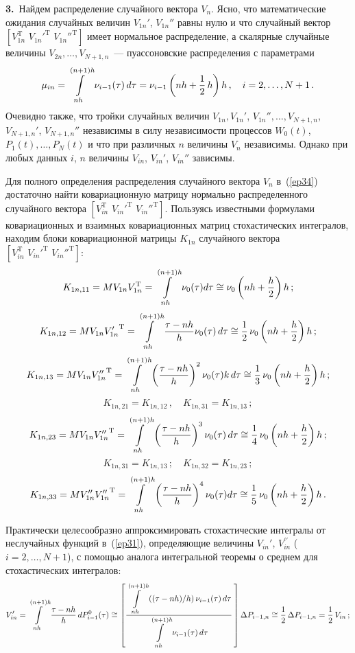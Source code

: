 {\textbf{3.}\ Найдем распределение случайного вектора $V_n$. Ясно, что математические
ожидания случайных величин $V_{1n}'$, $V_{1n}''$ равны нулю и что
случайный вектор $[V_{1n}^{\mathrm{T}}\,\, {V_{1n}'}^{\mathrm{T}}\,\, {V_{1n}''}^{\mathrm{T}}]$
имеет нормальное распределение, а скалярные случайные величины
$V_{2n},\ldots,V_{N+1,n}$~--- пуассоновские распределения с параметрами
\begin{equation*}
\mu_{in}=\inh \nu_{i-1}(\tau)\,d\tau=\nu_{i-1}
    \left(nh+\fr{1}{2}\,h\right)h\,,\quad i=2,\ldots,N+1\,. %
    \end{equation*}
Очевидно также, что тройки случайных величин
$V_{1n}, V_{1n}'$, $V_{1n}'',\ldots,V_{N+1,n}$, $V_{N+1,n}'$, $V_{N+1,n}''$
независимы в силу независимости процессов $W_0(t)$,
$P_1(t),\ldots,P_N(t)$
и что при различных $n$ величины $V_n$ независимы. Однако при любых
данных $i$, $n$ величины $V_{in}$, $V_{in}'$, $V_{in}''$ зависимы.

Для полного определения распределения случайного вектора $V_n$ в~(\ref{ep34}) достаточно найти ковариационную матрицу нормально
распределенного случайного вектора $[V_{in}^{\mathrm{T}}\,\,{V_{in}'}^{\mathrm{T}}\,\,{V_{in}''}^{\mathrm{T}}]$. Пользуясь известными
формулами ковариационных и взаимных ковариационных матриц
стохастических интегралов, находим блоки ковариационной
матрицы $K_{1n}$ случайного вектора $[V_{in}^{\mathrm{T}}\,\,{V_{in}'}^{\mathrm{T}}\,\,{V_{in}''}^{\mathrm{T}}]$:
    $$K_{1n,11}=MV_{1n}V_{1n}^{\mathrm{T}}=\int\limits_{nh}^{(n+1)h} \nu_0(\tau)d\tau\cong \nu_0\left(nh+\displaystyle\frac{\displaystyle h\mathstrut}{\displaystyle 2\mathstrut}\right)h\,;$$
    $$K_{1n,12}=MV_{1n}{V_{1n}'}^{\mathrm{T}}=\int\limits_{nh}^{(n+1)h} {\displaystyle\frac{\displaystyle \tau-nh\mathstrut}{\displaystyle h\mathstrut}} \nu_0(\tau)\,d\tau
    \cong \displaystyle\frac{\displaystyle 1\mathstrut}{\displaystyle 2\mathstrut}\,\nu_0\left(nh+\displaystyle\frac{\displaystyle h\mathstrut}{\displaystyle 2\mathstrut}\right)h\,;$$
    $$K_{1n,13}=MV_{1n}{V_{1n}''}^{\mathrm{T}}=\int\limits_{nh}^{(n+1)h} \left({\displaystyle\frac{\displaystyle \tau-nh\mathstrut}{\displaystyle h\mathstrut}}\right)^2 \nu_0(\tau)k\,d\tau
    \cong \displaystyle\frac{\displaystyle 1\mathstrut}{\displaystyle 3\mathstrut}\,\nu_0\left(nh+\displaystyle\frac{\displaystyle h\mathstrut}{\displaystyle 2\mathstrut}\right)h\,;$$
    \begin{equation*}
     K_{1n,21}= K_{1n,12}\,,\quad K_{1n,31}= K_{1n,13}\,; %
     \end{equation*}
    $$K_{1n,23}=MV_{1n}{V_{1n}''}^{\mathrm{T}}=\int\limits_{nh}^{(n+1)h} \left({\displaystyle\frac{\displaystyle \tau-nh\mathstrut}{\displaystyle h\mathstrut}}\right)^3 \nu_0(\tau)\,d\tau
    \cong \displaystyle\frac{\displaystyle 1\mathstrut}{\displaystyle 4\mathstrut}\,\nu_0\left(nh+\displaystyle\frac{\displaystyle h\mathstrut}{\displaystyle 2\mathstrut}\right)h\,;$$
    $$ K_{1n,31}= K_{1n,13}\,;\quad K_{1n,32}= K_{1n,23}\,;$$
    $$K_{1n,33}=MV_{1n}''{V_{1n}''}^{\mathrm{T}}=\int\limits_{nh}^{(n+1)h} \left({\displaystyle\frac{\displaystyle \tau-nh\mathstrut}{\displaystyle h\mathstrut}}\right)^4
    \nu_0(\tau)d\tau\cong \displaystyle\frac{\displaystyle 1\mathstrut}{\displaystyle 5\mathstrut}\,\nu_0\left(nh+\displaystyle\frac{\displaystyle h\mathstrut}{\displaystyle 2\mathstrut}\right)h\,.$$

Практически целесообразно аппроксимировать
стохастические интегралы от неслучайных
функций в~(\ref{ep31}), определяющие величины $V_{in}'$, $V_{in}^{\prime\prime}$
($i=2,\ldots,N+1$), с помощью аналога интегральной теоремы о среднем
для стохастических интегралов:
    \begin{equation*}
    V_{in}'=\inh \ovth\, dP_{i-1}^0(\tau)\cong \left[\fr{\inh \left(
    (\tau-nh)/h\right) \nu_{i-1}(\tau)\,d\tau}{\inh \nu_{i-1}(\tau)\,d\tau}\,
    \right]\Delta P_{i-1,n}\cong \fr{1}{2}\,\Delta P_{i-1,n}=
\fr{1}{2}\,V_{in}\,; %
\end{equation*}

}

